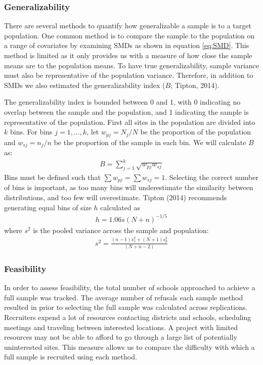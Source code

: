 \documentclass[man,floatsintext]{apa6}
\begin{document}
\hypertarget{generalizability}{%
\subsubsection{Generalizability}\label{generalizability}}

There are several methods to quantify how generalizable a sample is to a target population. One common method is to compare the sample to the population on a range of covariates by examining SMDs as shown in equation \eqref{eq:SMD}. This method is limited as it only provides us with a measure of how close the sample means are to the population means. To have true generalizability, sample variance must also be representative of the population variance. Therefore, in addition to SMDs we also estimated the generalizability index (\(B\); Tipton, 2014).

The generalizability index is bounded between 0 and 1, with 0 indicating no overlap between the sample and the population, and 1 indicating the sample is representative of the population. First all sites in the population are divided into \(k\) bins. For bins \(j = 1,...,k\), let \(w_{pj} = N_j/N\) be the proportion of the population and \(w_{sj} = n_j/n\) be the proportion of the sample in each bin. We will calculate \(B\) as:
\begin{align}
B = \sum^k_{j=1}\sqrt{w_{pj}w_{sj}}
\end{align}
Bins must be defined such that \(\sum{w_{pj}} = \sum{w_{sj}} = 1\). Selecting the correct number of bins is important, as too many bins will underestimate the similarity between distributions, and too few will overestimate. Tipton (2014) recommends generating equal bins of size \(h\) calculated as
\begin{align}
h = 1.06s(N+n)^{-1/5}
\end{align}
where \(s^2\) is the pooled variance across the sample and population:
\begin{align}
s^2 = \frac{(n - 1)s^2_s + (N + 1)s^2_p}{(N + n - 2)}
\end{align}

\hypertarget{feasibility}{%
\subsubsection{Feasibility}\label{feasibility}}

In order to assess feasibility, the total number of schools approached to achieve a full sample was tracked. The average number of refusals each sample method resulted in prior to selecting the full sample was calculated across replications. Recruiters expend a lot of resources contacting districts and schools, scheduling meetings and traveling between interested locations. A project with limited resources may not be able to afford to go through a large list of potentially uninterested sites. This measure allows us to compare the difficulty with which a full sample is recruited using each method.
\end{document}
